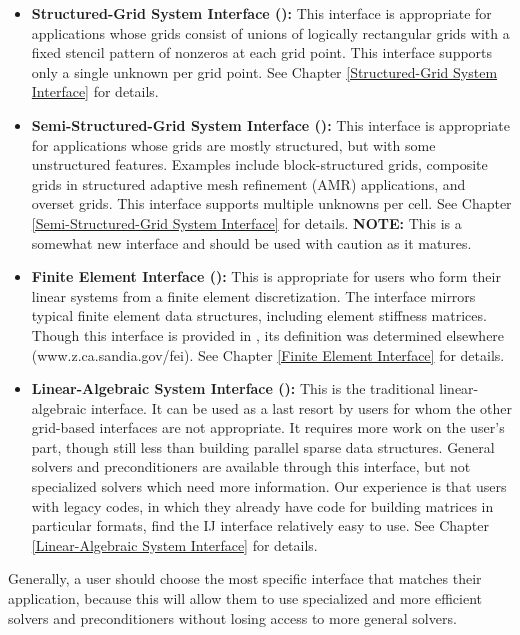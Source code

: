 \begin{itemize}

\item
{\bf Structured-Grid System Interface ():} This interface
is appropriate for applications whose grids consist of unions of
logically rectangular grids with a fixed stencil pattern of nonzeros
at each grid point.  This interface supports only a single unknown per
grid point.
See Chapter \ref{Structured-Grid System Interface} for details.

\item
{\bf Semi-Structured-Grid System Interface ():} This
interface is appropriate for applications whose grids are mostly
structured, but with some unstructured features.  Examples include
block-structured grids, composite grids in structured adaptive mesh
refinement (AMR) applications, and overset grids.  This interface
supports multiple unknowns per cell.
See Chapter \ref{Semi-Structured-Grid System Interface} for details.
{\bf NOTE:} This is a somewhat new interface and should be used with
caution as it matures.

\item
{\bf Finite Element Interface ():} This is appropriate for
users who form their linear systems from a finite element
discretization.  The interface mirrors typical finite element data
structures, including element stiffness matrices.  Though this
interface is provided in \hypre{}, its definition was determined
elsewhere (www.z.ca.sandia.gov/fei).
See Chapter \ref{Finite Element Interface} for details.

\item
{\bf Linear-Algebraic System Interface ():} This is the
traditional linear-algebraic interface.  It can be used as a last
resort by users for whom the other grid-based interfaces are not
appropriate.  It requires more work on the user's part, though still
less than building parallel sparse data structures.  General solvers
and preconditioners are available through this interface, but not
specialized solvers which need more information.  Our experience is
that users with legacy codes, in which they already have code for
building matrices in particular formats, find the IJ interface
relatively easy to use.
See Chapter \ref{Linear-Algebraic System Interface} for details.

\end{itemize}

Generally, a user should choose the most specific interface that
matches their application, because this will allow them to use
specialized and more efficient solvers and preconditioners without
losing access to more general solvers.

